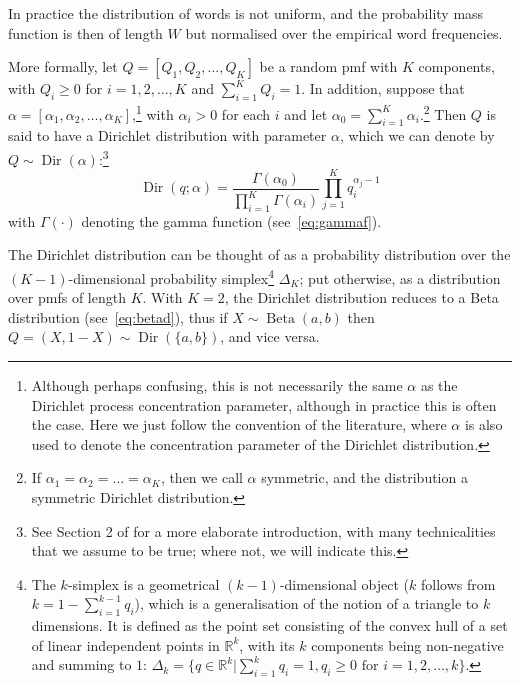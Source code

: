 In practice the distribution of words is not uniform, and the probability mass function is then of length $W$ but normalised over the empirical word frequencies. 

More formally, let $Q = [Q_1, Q_2, \ldots, Q_K]$ be a random pmf with $K$ components, with $Q_i \geq 0$ for $i = 1,2,\ldots,K$ and $\sum_{i=1}^K Q_i = 1$. In addition, suppose that $\alpha = [\alpha_1,\alpha_2,\ldots,\alpha_K]$,\footnote{Although perhaps confusing, this is not necessarily the same $\alpha$ as the Dirichlet process concentration parameter, although in practice this is often the case. Here we just follow the convention of the literature, where $\alpha$ is also used to denote the concentration parameter of the Dirichlet distribution.} with $\alpha_i > 0$ for each $i$ and let $\alpha_0 = \sum_{i=1}^K \alpha_i$.\footnote{If $\alpha_1=\alpha_2=\ldots=\alpha_K$, then we call $\alpha$ symmetric, and the distribution a symmetric Dirichlet distribution.} Then $Q$ is said to have a Dirichlet distribution with parameter $\alpha$, which we can denote by $Q \sim \operatorname{Dir}(\alpha)$:\footnote{See Section 2 of \citet{Ferguson1973A} for a more elaborate introduction, with many technicalities that we assume to be true; where not, we will indicate this.\cite{Ferguson1973A}}
\begin{equation}
	\operatorname{Dir}(q; \alpha) = \frac{\Gamma(\alpha_0)}{\prod_{i=1}^K \Gamma(\alpha_i)} \prod_{j=1}^K q_i^{\alpha_j-1}
\end{equation}
with $\Gamma(\cdot)$ denoting the gamma function (see~\cref{eq:gammaf}).

The Dirichlet distribution can be thought of as a probability distribution over the $(K-1)$-dimensional probability simplex\footnote{The $k$-simplex is a geometrical $(k-1)$-dimensional object ($k$ follows from $k=1-\sum_{i=1}^{k-1} q_i$), which is a generalisation of the notion of a triangle to $k$ dimensions. It is defined as the point set consisting of the convex hull of a set of linear independent points in $\mathbb{R}^k$, with its $k$ components being non-negative and summing to $1$: $\Delta_k = \{q\in\mathbb{R}^k|\sum_{i=1}^k q_i=1,q_i\geq0\text{ for }i=1,2,\ldots,k\}$.} $\Delta_K$; put otherwise, as a distribution over pmfs of length $K$. With $K=2$, the Dirichlet distribution reduces to a Beta distribution (see~\cref{eq:betad}), thus if $X\sim\operatorname{Beta}(a,b)$ then $Q=(X,1-X)\sim\operatorname{Dir}(\{a,b\})$, and vice versa.

